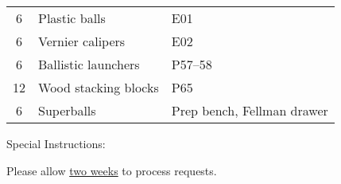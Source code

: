 \documentclass{article}
\begin{document}
\begin{center}
\begin{tabular}{|c|p{2.5in}|l|}
6 &
Plastic balls &
\begin{minipage}{1.0in}
\raggedright
\vspace{1ex}
E01 \par
\vspace{1ex}
\end{minipage}
\\

6 &
Vernier calipers &
\begin{minipage}{1.0in}
\raggedright
\vspace{1ex}
E02 \par
\vspace{1ex}
\end{minipage}
\\

6 &
Ballistic launchers &
\begin{minipage}{1.0in}
\raggedright
\vspace{1ex}
P57--58 \par
\vspace{1ex}
\end{minipage}
\\

12 &
Wood stacking blocks &
\begin{minipage}{1.0in}
\raggedright
\vspace{1ex}
P65 \par
\vspace{1ex}
\end{minipage}
\\

6 &
Superballs &
\begin{minipage}{1.0in}
\raggedright
\vspace{1ex}
Prep bench, Fellman drawer \par
\vspace{1ex}
\end{minipage}
\\

\hline
\end{tabular}

\end{center}

\vspace{0.2in}

Special Instructions: \par


\underline{\makebox[\textwidth]{\textbf{  }}} \par

\underline{\makebox[\textwidth]{\textbf{  }}} \par

\underline{\makebox[\textwidth]{\textbf{  }}} \par

\vspace{0.2in}

Please allow \underline{two weeks} to process requests.
\end{document}
